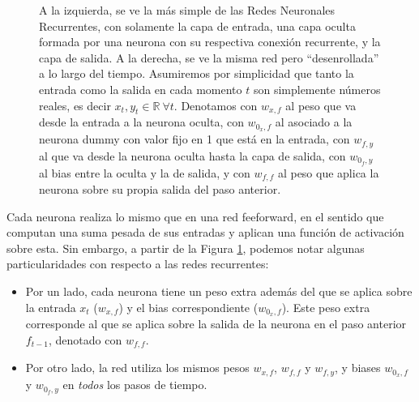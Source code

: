 \documentclass[../../main.tex]{subfiles}
\begin{document}
\begin{figure}[ht]
    \caption{A la izquierda, se ve la más simple de las Redes Neuronales Recurrentes, con
    solamente la capa de entrada, una capa oculta formada por una neurona con su
    respectiva conexión recurrente, y la capa de salida. A la derecha, se ve la misma red
    pero ``desenrollada'' a lo largo del tiempo. Asumiremos por simplicidad que tanto la
    entrada como la salida en cada momento \(t\) son simplemente números reales, es decir
    \(x_t, y_t \in \mathbb{R} \ \forall t\). Denotamos con \(w_{x,f}\) al peso que va
    desde la entrada a la neurona oculta, con \(w_{0_x,f}\) al asociado a la neurona dummy
    con valor fijo en 1 que está en la entrada, con \(w_{f,y}\) al que va desde la neurona
    oculta hasta la capa de salida, con \(w_{0_f, y}\) al bias entre la oculta y la de
    salida, y con \(w_{f,f}\) al peso que aplica la neurona sobre su propia salida del paso
    anterior.}
    \label{fig:simple-rnn}
\end{figure}

Cada neurona realiza lo mismo que en una red feeforward, en el sentido que computan una
suma pesada de sus entradas y aplican una función de activación sobre esta. Sin embargo, a
partir de la Figura \ref{fig:simple-rnn}, podemos notar algunas particularidades con
respecto a las redes recurrentes:
\begin{itemize}
    \item Por un lado, cada neurona tiene un peso extra además del que se aplica sobre la
    entrada \(x_t\) (\(w_{x,f}\)) y el bias correspondiente (\(w_{0_x,f}\)). Este peso
    extra corresponde al que se aplica sobre la salida de la neurona en el paso anterior
    \(f_{t-1}\), denotado con \(w_{f,f}\).
    \item Por otro lado, la red utiliza los mismos pesos \(w_{x,f}\), \(w_{f,f}\) y
    \(w_{f,y}\), y biases \(w_{0_x,f}\) y \(w_{0_f, y}\) en \textit{todos} los pasos de
    tiempo.
\end{itemize}
\end{document}
